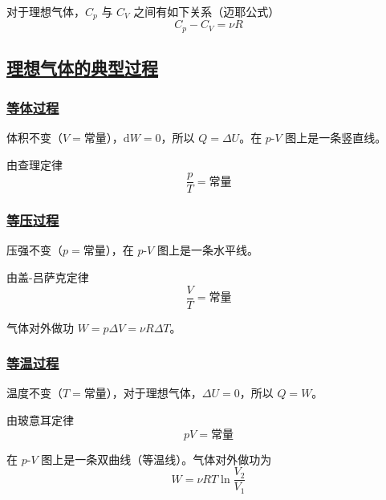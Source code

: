 对于理想气体，$C_p$ 与 $C_V$ 之间有如下关系（迈耶公式）
\begin{equation}
    C_p - C_V = \nu R
\end{equation}

\subsection{\protect\hyperlink{:}{理想气体的典型过程}}

\subsubsection{\protect\hyperlink{:}{等体过程}}

体积不变（$V = \text{常量}$），$\mathrm{d}W = 0$，所以 $Q = \Delta U$。在 $p$-$V$ 图上是一条竖直线。

由查理定律
\begin{equation}
    \frac{p}{T} = \text{常量}
\end{equation}

\subsubsection{\protect\hyperlink{:}{等压过程}}

压强不变（$p = \text{常量}$），在 $p$-$V$ 图上是一条水平线。

由盖-吕萨克定律
\begin{equation}
    \frac{V}{T} = \text{常量}
\end{equation}

气体对外做功 $W = p\Delta V = \nu R\Delta T$。

\subsubsection{\protect\hyperlink{:}{等温过程}}

温度不变（$T = \text{常量}$），对于理想气体，$\Delta U = 0$，所以 $Q = W$。

由玻意耳定律
\begin{equation}
    pV = \text{常量}
\end{equation}

在 $p$-$V$ 图上是一条双曲线（等温线）。气体对外做功为
\begin{equation}
    W = \nu RT\ln\frac{V_2}{V_1}
\end{equation}

